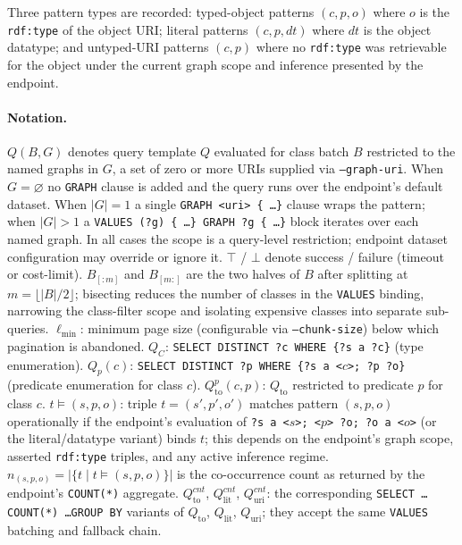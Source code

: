 \documentclass[12pt]{article}
\begin{document}
Three pattern types are recorded: typed-object patterns $(c, p, o)$
where $o$ is the \texttt{rdf:type} of the object URI; literal
patterns $(c, p, \mathit{dt})$ where $\mathit{dt}$ is the object
datatype; and untyped-URI patterns $(c, p)$ where no
\texttt{rdf:type} was retrievable for the object under the current
graph scope and inference presented by the endpoint.

\paragraph*{Notation.}
$Q(B, G)$ denotes query template $Q$ evaluated for class batch $B$
restricted to the named graphs in $G$, a set of zero or more URIs
supplied via \texttt{--graph-uri}.
When $G = \varnothing$ no \texttt{GRAPH} clause is added and the
query runs over the endpoint's default dataset.
When $|G| = 1$ a single \texttt{GRAPH <uri> \{ \ldots \}} clause
wraps the pattern; when $|G| > 1$ a
\texttt{VALUES (?g) \{ \ldots \} GRAPH ?g \{ \ldots \}} block
iterates over each named graph.
In all cases the scope is a query-level restriction; endpoint dataset
configuration may override or ignore it.
$\top$ / $\bot$ denote success / failure (timeout or cost-limit).
$B_{[:m]}$ and $B_{[m:]}$ are the two halves of $B$ after splitting
at $m=\lfloor|B|/2\rfloor$; bisecting reduces the number of classes
in the \texttt{VALUES} binding, narrowing the class-filter scope and
isolating expensive classes into separate sub-queries.
$\ell_{\min}$: minimum page size (configurable via \texttt{--chunk-size})
below which pagination is abandoned.
$Q_C$: \texttt{SELECT DISTINCT ?c WHERE \{?s a ?c\}} (type
enumeration).
$Q_p(c)$: \texttt{SELECT DISTINCT ?p WHERE \{?s a <$c$>; ?p ?o\}}
(predicate enumeration for class $c$).
$Q_\mathrm{to}^p(c,p)$: $Q_\mathrm{to}$ restricted to predicate $p$
for class $c$.
$t \models (s,p,o)$: triple $t=(s',p',o')$ matches pattern $(s,p,o)$
operationally if the endpoint's evaluation of
\texttt{?s a <$s$>; <$p$> ?o; ?o a <$o$>} (or the literal/datatype
variant) binds $t$; this depends on the endpoint's graph scope,
asserted \texttt{rdf:type} triples, and any active inference regime.
$n_{(s,p,o)} = |\{t \mid t \models (s,p,o)\}|$ is the co-occurrence
count as returned by the endpoint's \texttt{COUNT(*)} aggregate.
$Q_\mathrm{to}^{cnt}$, $Q_\mathrm{lit}^{cnt}$,
$Q_\mathrm{uri}^{cnt}$: the corresponding
\texttt{SELECT \ldots COUNT(*) \ldots GROUP BY} variants of
$Q_\mathrm{to}$, $Q_\mathrm{lit}$, $Q_\mathrm{uri}$; they accept
the same \texttt{VALUES} batching and fallback chain.
\end{document}
